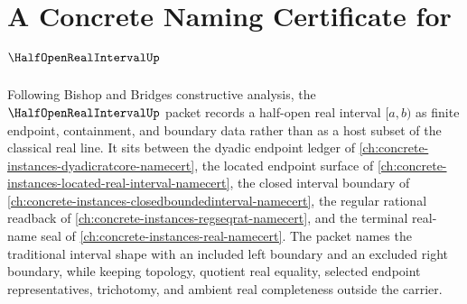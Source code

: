\chapter{A Concrete Naming Certificate for $\HalfOpenRealIntervalUp$}
\label{ch:concrete-instances-half-open-real-interval-namecert}

Following Bishop and Bridges constructive analysis, the $\HalfOpenRealIntervalUp$ packet records a half-open real interval $[a,b)$ as finite endpoint, containment, and boundary data rather than as a host subset of the classical real line. It sits between the dyadic endpoint ledger of \autoref{ch:concrete-instances-dyadicratcore-namecert}, the located endpoint surface of \autoref{ch:concrete-instances-located-real-interval-namecert}, the closed interval boundary of \autoref{ch:concrete-instances-closedboundedinterval-namecert}, the regular rational readback of \autoref{ch:concrete-instances-regseqrat-namecert}, and the terminal real-name seal of \autoref{ch:concrete-instances-real-namecert}. The packet names the traditional interval shape with an included left boundary and an excluded right boundary, while keeping topology, quotient real equality, selected endpoint representatives, trichotomy, and ambient real completeness outside the carrier.

